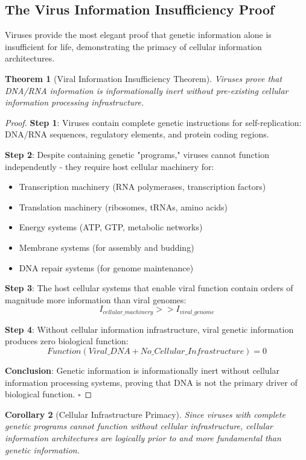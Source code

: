 \documentclass[12pt,a4paper]{article}
\newtheorem{theorem}{Theorem}[section]
\newtheorem{corollary}[theorem]{Corollary}
\begin{document}
\subsection{The Virus Information Insufficiency Proof}

Viruses provide the most elegant proof that genetic information alone is insufficient for life, demonstrating the primacy of cellular information architectures.

\begin{theorem}[Viral Information Insufficiency Theorem]
Viruses prove that DNA/RNA information is informationally inert without pre-existing cellular information processing infrastructure.
\end{theorem}

\begin{proof}
\textbf{Step 1}: Viruses contain complete genetic instructions for self-replication: DNA/RNA sequences, regulatory elements, and protein coding regions.

\textbf{Step 2}: Despite containing genetic "programs," viruses cannot function independently - they require host cellular machinery for:
\begin{itemize}
\item Transcription machinery (RNA polymerases, transcription factors)
\item Translation machinery (ribosomes, tRNAs, amino acids)
\item Energy systems (ATP, GTP, metabolic networks)
\item Membrane systems (for assembly and budding)
\item DNA repair systems (for genome maintenance)
\end{itemize}

\textbf{Step 3}: The host cellular systems that enable viral function contain orders of magnitude more information than viral genomes:
$$I_{cellular\_machinery} >> I_{viral\_genome}$$

\textbf{Step 4}: Without cellular information infrastructure, viral genetic information produces zero biological function:
$$Function(Viral\_DNA + No\_Cellular\_Infrastructure) = 0$$

\textbf{Conclusion}: Genetic information is informationally inert without cellular information processing systems, proving that DNA is not the primary driver of biological function. $\square$
\end{proof}

\begin{corollary}[Cellular Infrastructure Primacy]
Since viruses with complete genetic programs cannot function without cellular infrastructure, cellular information architectures are logically prior to and more fundamental than genetic information.
\end{corollary}
\end{document}
